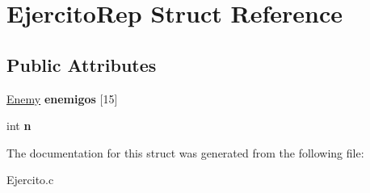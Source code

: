 \hypertarget{struct_ejercito_rep}{}\section{Ejercito\+Rep Struct Reference}
\label{struct_ejercito_rep}
\subsection*{Public Attributes}
\begin{DoxyCompactItemize}
\item 
\mbox{\label{struct_ejercito_rep_a69f821c02ecc9f69695fd2af897e93d7}} 
\mbox{\hyperlink{_enemy_8h_a79aeea8a42dc103d27442b64a43d513d}{Enemy}} {\bfseries enemigos} \mbox{[}15\mbox{]}
\item 
\mbox{\label{struct_ejercito_rep_a4d088e8129b2c840e9db393fdd506b76}} 
int {\bfseries n}
\end{DoxyCompactItemize}


The documentation for this struct was generated from the following file\+:\begin{DoxyCompactItemize}
\item 
Ejercito.\+c\end{DoxyCompactItemize}
